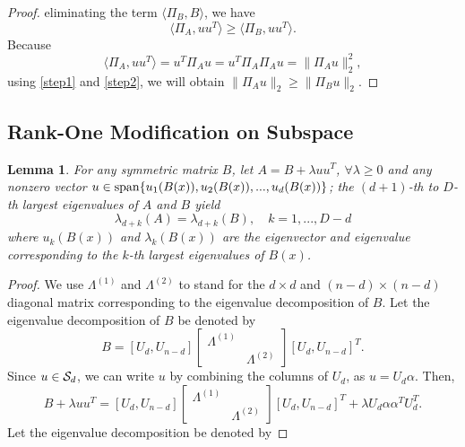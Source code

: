 \documentclass[aos,preprint]{imsart}
\newtheorem{lemma}[theorem]{Lemma}
\theoremstyle{remark}
\begin{document}
\begin{appendix}
\begin{proof}
eliminating the term $\langle \Pi_B, B\rangle$, we have
\begin{equation}\label{step1}
\langle  \Pi_A , uu^T\rangle \geq  \langle  \Pi_B,  uu^T\rangle.
\end{equation}
Because
\begin{equation}\label{step2}
\langle \Pi_A, uu^T \rangle= u^T \Pi_A u = u^T \Pi_A \Pi_A u = \|\Pi_A u\|_2^2,
\end{equation}
using \eqref{step1} and \eqref{step2}, we will obtain $\|\Pi_A u\|_2\geq \|\Pi_B u\|_2$.
\end{proof}
\subsection{Rank-One Modification on Subspace}
\begin{lemma}\label{eigvenvalue}
For any symmetric matrix $B$, let $A = B+\lambda u u^T$,  $\forall \lambda \geq 0$ and any nonzero vector $u\in  {\rm span}\{ u_1(B(x)), u_2(B(x)),..., u_d(B(x))\}$; the $(d+1)$-th  to $D$-th largest eigenvalues of $A$ and $B$ yield
\[
\lambda_{d+k}(A) = \lambda_{d+k}(B),\quad k=1,...,D-d
\]
where $u_k(B(x))$ and $\lambda_k(B(x))$ are the eigenvector and eigenvalue corresponding to the $k$-th largest eigenvalues of $B(x)$.
\end{lemma}
\begin{proof}
We use $\Lambda^{(1)}$ and $\Lambda^{(2)}$ to stand for the $d\times d$ and $(n-d)\times(n-d)$ diagonal matrix corresponding to the eigenvalue decomposition of $B$. Let the eigenvalue decomposition of $B$ be denoted by
\[
B = [U_d, U_{n-d}] 
\left[
\begin{array}{cc}
\Lambda^{(1)} &\\
 &\Lambda^{(2)}
\end{array}
\right]
[U_d, U_{n-d}]^T.
\]
Since $u\in {\cal S}_d$, we can write $u$ by combining the columns of $U_d$, as $u = U_d\alpha$. Then,
\[
B+\lambda u u^T = [U_d, U_{n-d}] 
\left[
\begin{array}{cc}
\Lambda^{(1)} &\\
  &\Lambda^{(2)}
\end{array}
\right]
[U_d, U_{n-d}]^T+ \lambda U_d \alpha \alpha^T U_d^T.
\]
Let the eigenvalue decomposition be denoted by

\end{proof}
\end{appendix}
\end{document}
